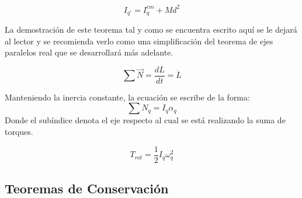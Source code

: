 \documentclass[/home/hernan/Documentos/Apuntes_mecanica_teorica/main.tex]{subfiles}
\begin{document}

	\begin{theorem}
		\begin{equation}
			I_{{q}'}= I_{q}^{cm} + Md^{2}
		\end{equation}

		La demostración de este teorema tal y como se encuentra escrito aquí se le dejará al lector y se recomienda verlo como una simplificación del teorema de ejes paralelos real que se desarrollará más adelante.
	\end{theorem}

	\begin{definition}
		\begin{equation}
			\sum \vec{N} = \frac{d L}{dt} = \dot{L}
			\label{eq: NSecondlawrot}
		\end{equation}

		Manteniendo la inercia constante, la ecuación se escribe de la forma:
		\begin{equation}
			\sum N_{q} = I_{q} \alpha_{q}
		\end{equation}
		Donde el subíndice denota el eje respecto al cual se está realizando la suma de torques.

		
	\end{definition}

	\begin{definition}
		\begin{equation}
			T_{rot} = \frac{1}{2}I_{q}\omega_{q}^{2}
			\label{eq: Trot}
		\end{equation}
	\end{definition}

	\subsection{Teoremas de Conservación}

	\begin{theorem}
		
	\end{theorem}
\end{document}
